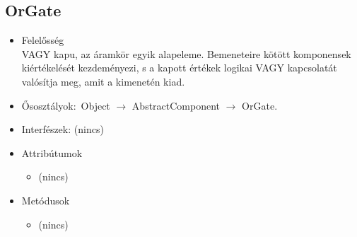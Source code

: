\subsection{OrGate}
\begin{itemize}
\item Felelősség\\
VAGY kapu, az áramkör egyik alapeleme. Bemeneteire kötött komponensek  kiértékelését kezdeményezi, s a kapott értékek logikai VAGY kapcsolatát  valósítja meg, amit a kimenetén kiad.
\item Ősosztályok:\ Object $\rightarrow{}$ AbstractComponent $\rightarrow{}$ OrGate.
\item Interfészek: (nincs)
\item Attribútumok $\ $
\begin{itemize}
\item (nincs)
\end{itemize}
\item Metódusok$\ $
\begin{itemize}
\item (nincs)
\end{itemize}
\end{itemize}


